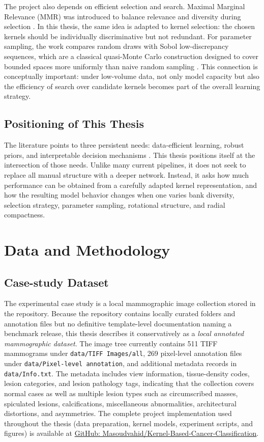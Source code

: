 \documentclass{cernatsnote}
\let\oldsection\section
\let\oldsubsection\subsection
\let\oldsubsubsection\subsubsection
\let\chapter\oldsection
\let\section\oldsubsection
\let\subsection\oldsubsubsection
\begin{document}
The project also depends on efficient selection and search. Maximal Marginal Relevance (MMR) was introduced to balance relevance and diversity during selection \citep{goldstein1998mmr}. In this thesis, the same idea is adapted to kernel selection: the chosen kernels should be individually discriminative but not redundant. For parameter sampling, the work compares random draws with Sobol low-discrepancy sequences, which are a classical quasi-Monte Carlo construction designed to cover bounded spaces more uniformly than naive random sampling \citep{sobol1967cube}. This connection is conceptually important: under low-volume data, not only model capacity but also the efficiency of search over candidate kernels becomes part of the overall learning strategy.

\section{Positioning of This Thesis}
The literature points to three persistent needs: data-efficient learning, robust priors, and interpretable decision mechanisms \citep{litjens2017survey,pachetti2024fewshot,rudin2019blackbox,salahuddin2022transparency}. This thesis positions itself at the intersection of those needs. Unlike many current pipelines, it does not seek to replace all manual structure with a deeper network. Instead, it asks how much performance can be obtained from a carefully adapted kernel representation, and how the resulting model behavior changes when one varies bank diversity, selection strategy, parameter sampling, rotational structure, and radial compactness.

\chapter{Data and Methodology}
\section{Case-study Dataset}
The experimental case study is a local mammographic image collection stored in the repository. Because the repository contains locally curated folders and annotation files but no definitive template-level documentation naming a benchmark release, this thesis describes it conservatively as a \emph{local annotated mammographic dataset}. The image tree currently contains 511 TIFF mammograms under \texttt{data/TIFF Images/all}, 269 pixel-level annotation files under \texttt{data/Pixel-level annotation}, and additional metadata records in \texttt{data/Info.txt}. The metadata includes view information, tissue-density codes, lesion categories, and lesion pathology tags, indicating that the collection covers normal cases as well as multiple lesion types such as circumscribed masses, spiculated lesions, calcifications, miscellaneous abnormalities, architectural distortions, and asymmetries.
The complete project implementation used throughout the thesis (data preparation, kernel models, experiment scripts, and figures) is available at \href{https://github.com/Masoudvahid/Kernel-Based-Cancer-Classification}{GitHub: Masoudvahid/Kernel-Based-Cancer-Classification}.
\end{document}
